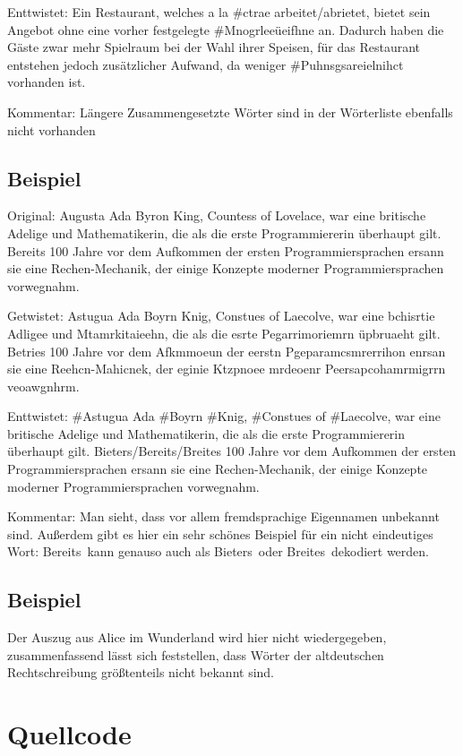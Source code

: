 \documentclass[a4paper,10pt,ngerman]{scrartcl}
\begin{document}
\noindent Enttwistet: Ein Restaurant, welches a la \#ctrae arbeitet/abrietet, bietet sein Angebot ohne eine vorher festgelegte \#Mnogrleeüeifhne an. Dadurch haben die Gäste zwar mehr Spielraum bei der Wahl ihrer Speisen, für das Restaurant entstehen jedoch zusätzlicher Aufwand, da weniger \#Puhnsgsareielnihct vorhanden ist.

\noindent Kommentar: Längere Zusammengesetzte Wörter sind in der Wörterliste ebenfalls nicht vorhanden
\subsection{Beispiel}

\noindent Original: Augusta Ada Byron King, Countess of Lovelace, war eine britische Adelige und Mathematikerin, die als die erste Programmiererin überhaupt gilt. Bereits 100 Jahre vor dem Aufkommen der ersten Programmiersprachen ersann sie eine Rechen-Mechanik, der einige Konzepte moderner Programmiersprachen vorwegnahm.

\noindent Getwistet: Astugua Ada Boyrn Knig, Constues of Laecolve, war eine bchisrtie Adligee und Mtamrkitaieehn, die als die esrte Pegarrimoriemrn üpbruaeht gilt. Betries 100 Jahre vor dem Afkmmoeun der eerstn Pgeparamcsmrerrihon enrsan sie eine Reehcn-Mahicnek, der eginie Ktzpnoee mrdeoenr Peersapcohamrmigrrn veoawgnhrm.

\noindent Enttwistet: \#Astugua Ada \#Boyrn \#Knig, \#Constues of \#Laecolve, war eine britische Adelige und Mathematikerin, die als die erste Programmiererin überhaupt gilt. Bieters/Bereits/Breites 100 Jahre vor dem Aufkommen der ersten Programmiersprachen ersann sie eine Rechen-Mechanik, der einige Konzepte moderner Programmiersprachen vorwegnahm.

\noindent Kommentar: Man sieht, dass vor allem fremdsprachige Eigennamen unbekannt sind. Außerdem gibt es hier ein sehr schönes Beispiel für ein nicht eindeutiges Wort: \glqq Bereits\grqq\ kann genauso auch als \glqq Bieters\grqq\ oder \glqq Breites\grqq\ dekodiert werden.
\subsection{Beispiel}
Der Auszug aus Alice im Wunderland wird hier nicht wiedergegeben, zusammenfassend lässt sich feststellen, dass Wörter der altdeutschen Rechtschreibung größtenteils nicht bekannt sind.

\section{Quellcode}

\end{document}
